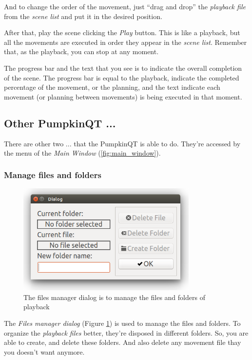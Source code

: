 \documentclass[oneside,a4paper,titlepage]{article}
\begin{document}
	And to change the order of the movement, just ``drag and drop'' the \emph{playback file} from the \emph{scene list} and put it in the desired position.
	
	After that, play the scene clicking the \emph{Play} button. This is like a playback, but all the movements are executed in order they appear in the \emph{scene list}. Remember that, as the playback, you can stop at any moment.
	
	The progress bar and the text that you see is to indicate the overall completion of the scene. The progress bar is equal to the playback, indicate the completed percentage of the movement, or the planning, and the text indicate each movement (or planning between movements) is being executed in that moment.
	
\subsection{Other PumpkinQT ...}

There are other two ... that the PumpkinQT is able to do. They're accessed by the menu of the \emph{Main Window} (\ref{fig:main_window}). 

\subsubsection{Manage files and folders}

\begin{figure}[ht!]
	\centering
	\includegraphics[width=0.8\textwidth]{manage_files}
	\caption[Files Manager]{The files manager dialog is to manage the files and folders of playback}
	\label{fig:manage_files}
\end{figure}

The \emph{Files manager dialog} (Figure \ref{fig:manage_files}) is used to manage the files and folders. To organize the \emph{playback files} better, they're disposed in different folders. So, you are able to create, and delete these folders. And also delete any movement file thay you doesn't want anymore.
\end{document}
